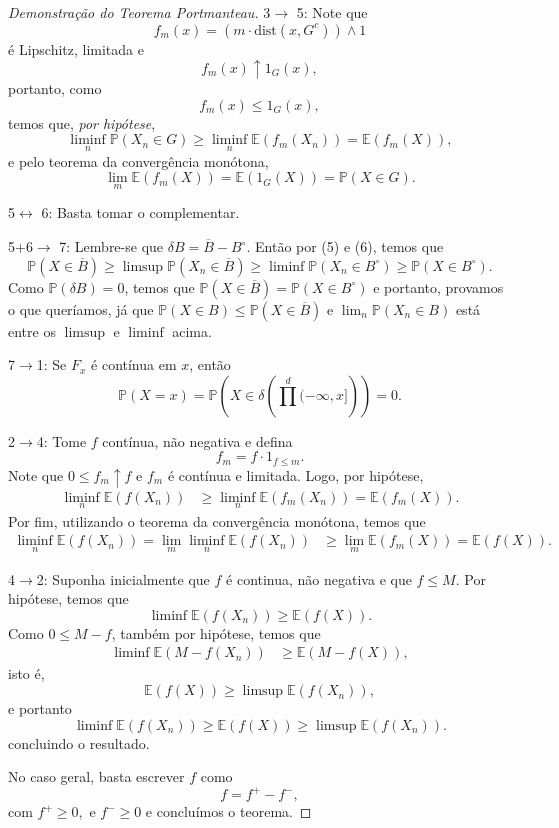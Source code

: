 \documentclass[12pt,a4paper,oneside]{book}
\theoremstyle{definition}
\theoremstyle{remark}
\numberwithin{equation}{section}
\newcommand{\E}{\mathbb{E}}
\newcommand{\pr}{\mathbb{P}}
\begin{document}
\begin{proof}[Demonstração do Teorema Portmanteau]
\textrm{3$\rightarrow$ 5:} Note que
$$f_m(x) = (m\cdot \textrm{dist}(x,G^c))\wedge 1 $$
é Lipschitz, limitada e 
$$f_m(x)\uparrow 1_{G}(x) ,$$
portanto, como
$$f_m(x)\leq 1_{ G}(x),  $$
temos que, \emph{por hipótese},
$$ \liminf_n \pr(X_n\in G) \geq \liminf_n \E(f_m(X_n)) = \E(f_m(X)),$$
e pelo teorema da convergência monótona,
$$\lim_m  \E(f_m(X)) =  \E(1_G(X)) = \pr(X\in G).$$

\textrm{5$\leftrightarrow$ 6:} Basta tomar o complementar.

\textrm{5+6$\rightarrow$ 7:} Lembre-se que $\delta B =\overline{B}- B^\circ$. Então por (5) e (6), temos que
$$ \pr(X\in \overline{B})\geq \limsup \pr(X_n\in \overline{B})\geq \liminf \pr(X_n\in B^\circ)\geq \pr(X\in B^\circ). $$
Como $\pr(\delta B) = 0$, temos que $\pr(X\in \overline{B}) = \pr(X\in B^\circ)$ e portanto, provamos o que queríamos, já que $\pr(X\in B)\leq \pr(X\in \overline{B})$ e $\lim_n\pr(X_n\in B)$ está entre os $\limsup$ e $\liminf$ acima. 


\textrm{7$\rightarrow$1:} Se $F_x$ é contínua em $x$, então 
$$\pr(X= x )=\pr\left(X\in \delta \left(\prod^d(-\infty,x]\right) \right)=0. $$ 

\textrm{2$\rightarrow$4:} Tome $f$ contínua, não negativa e defina
$$f_m = f\cdot 1_{f\leq m}.$$
Note que $0\leq f_m\uparrow f$ e $f_m$ é contínua e limitada. Logo, por hipótese,
\begin{align*}
\liminf_n \E(f(X_n)) &\geq \liminf_n \E(f_m(X_n)) = \E(f_m(X)).
\end{align*}
Por fim, utilizando o teorema da convergência monótona, temos que
\begin{align*}
\liminf_n \E(f(X_n))= \lim_m\liminf_n \E(f(X_n)) &\geq \lim_m \E(f_m(X)) = \E(f(X)).
\end{align*}


\textrm{4$\rightarrow$2:} Suponha inicialmente que $f$ é continua, não negativa e que $f\leq M$. Por hipótese, temos que
$$\liminf \E(f(X_n)) \geq \E(f(X)).$$
Como $0\leq M-f$, também por hipótese, temos que
$$
\begin{array}{lll}
\liminf \E(M-f(X_n)) &\geq \E(M-f(X)),
\end{array}
$$
isto é,
$$\E(f(X)) \geq  \limsup \E(f(X_n)), $$
e portanto
$$\liminf \E(f(X_n))\geq \E(f(X)) \geq  \limsup \E(f(X_n)).$$
concluindo o resultado.

No caso geral, basta escrever $f$ como
$$f= f^+ - f^-,$$
com $f^+\geq 0,$ e $f^-\geq 0$ e concluímos o teorema.
\end{proof}
\end{document}
